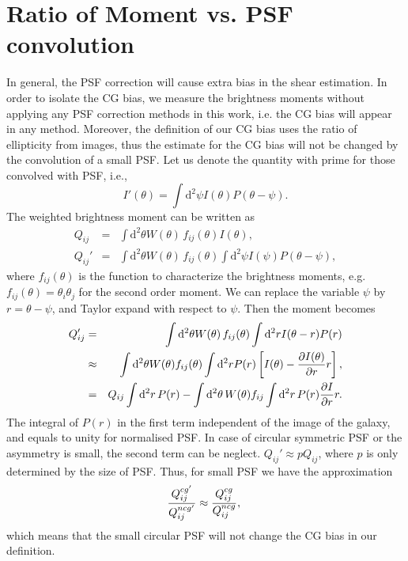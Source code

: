 \documentclass[useAMS,usenatbib]{mn2e}
\renewcommand{\d}{\mathrm{d}}
\newcommand{\bea}{\begin{eqnarray}}
\newcommand{\eea}{\end{eqnarray}}
\newcommand{\be}{\begin{equation}}
\newcommand{\ee}{\end{equation}}
\newcommand{\eck}[1]{\left[ #1 \right]}
\begin{document}
\section{Ratio of Moment vs. PSF convolution}
In general, the PSF correction will cause extra bias in the shear
estimation.  In order to isolate the CG bias, we measure the
brightness moments without applying any PSF correction methods in this
work, i.e. the CG bias will appear in any method.  Moreover, the
definition of our CG bias uses the ratio of ellipticity from images,
thus the estimate for the CG bias will not be changed by the
convolution of a small PSF.  Let us denote the quantity with prime for
those convolved with PSF, i.e.,
%
\be
I'(\theta) = \int \d^2 \psi I(\theta) P(\theta-\psi).
\ee
%
The weighted brightness moment can be written as
%
\bea
Q_{ij} &=& \int \d^2 \theta W(\theta)\, f_{ij}(\theta) I(\theta ),\\
Q_{ij}' &=& \int \d^2 \theta W(\theta)\, f_{ij}(\theta)\int \d^2\psi I(\psi) P(\theta-\psi),
\eea
%
where $f_{ij}(\theta)$ is the function to characterize the brightness
moments, e.g. $f_{ij}(\theta)=\theta_i\theta_j$ for the second order
moment. We can replace the variable $\psi$ by $r=\theta-\psi$, and
Taylor expand with respect to $\psi$. Then the moment becomes
%
\bea
Q_{ij}' &=& \int \d^2 \theta W(\theta)\, f_{ij}(\theta) \int \d^2r I(\theta-r) P(r)\\
&\approx &\int \d^2 \theta W(\theta) f_{ij}(\theta) \int \d^2r P(r) \eck{I(\theta)-{\partial I(\theta) \over \partial r}r}, \nonumber \\
&=&Q_{ij} \int \d^2r\,P(r) - \int \d^2\theta\, W(\theta) f_{ij} \int \d^2r\, P(r) {\partial I\over \partial r}r.\nonumber
\eea
%
The integral of $P(r)$ in the first term independent of the image of
the galaxy, and equals to unity for normalised PSF. In case of
circular symmetric PSF or the asymmetry is small, the second term can
be neglect. $Q_{ij}'\approx p Q_{ij}$, where $p$ is only determined
by the size of PSF. Thus, for small PSF we have the approximation
%
\be
{Q^{cg'}_{ij} \over Q^{ncg'}_{ij}} \approx
{Q^{cg}_{ij} \over Q^{ncg}_{ij}}, \;
\ee
%
which means that the small circular PSF will not change the CG bias in
our definition.
%
%



\end{document}
